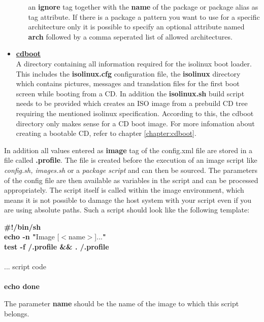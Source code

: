 \begin{itemize}
\begin{enumerate}
                an \textbf{ignore} tag together with the \textbf{name} of the
                package or package alias as tag attribute. If there is a
                package a pattern you want to use for a specific architecture
                only it is possible to specify an optional attribute named
                \textbf{arch} followed by a comma seperated list of allowed
                architectures.
      \end{enumerate}
\item \textbf{\underline{cdboot}}\\
A directory containing all information required for the isolinux
boot loader. This includes the \textbf{isolinux.cfg} configuration
file, the \textbf{isolinux} directory which contains pictures, messages and
translation files for the first boot screen while booting from a CD.
In addition the \textbf{isolinux.sh} build script needs to be provided
which creates an ISO image from a prebuild CD tree requiring the mentioned
isolinux specification. According to this, the cdboot directory
only makes sense for a CD boot image. For more infomation about creating
a bootable CD, refer to chapter \ref{chapter:cdboot}.
\end{itemize}

In addition all values entered as \textbf{image} tag of the config.xml
file are stored in a file called \textbf{.profile}. The file is created
before the execution of an image script like \textit{config.sh, images.sh}
or a \textit{package script} and can then be sourced. The parameters
of the config file are then available as variables in the
script and can be processed appropriately. The script itself is called
within the image environment, which means it
is not possible to damage the host system with your script even if you
are using absolute paths. Such a script should look like the following
template:

\begin{Command}{9cm}
\textbf{\#!/bin/sh}\\
\textbf{echo -n "}Image [$<$name$>$]...\textbf{"}\\
\textbf{test -f /.profile \&\& . /.profile}\\
\\
... script code\\
\\
\textbf{echo done}
\end{Command}

The parameter \textbf{name} should be the name of the image to which this
script belongs.

